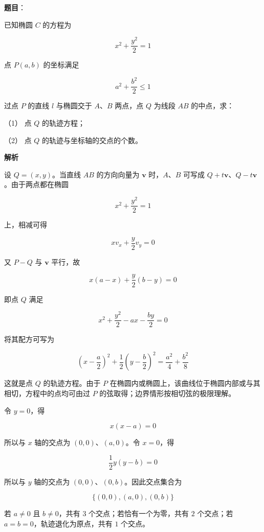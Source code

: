 \begin{answer}

\textbf{题目}：

已知椭圆 $C$ 的方程为

\nopagebreak[4]
\[
x^2+\dfrac{y^2}{2}=1
\]

点 $P(a,b)$ 的坐标满足

\nopagebreak[4]
\[
a^2+\dfrac{b^2}{2}\le1
\]

过点 $P$ 的直线 $l$ 与椭圆交于 $A\text{、}B$ 两点，点 $Q$ 为线段 $AB$ 的中点，求：

（1） 点 $Q$ 的轨迹方程；

（2） 点 $Q$ 的轨迹与坐标轴的交点的个数。

\textbf{解析}


设 $Q=(x,y)$。当直线 $AB$ 的方向向量为 $\boldsymbol v$ 时，$A$、$B$ 可写成 $Q+t\boldsymbol v$、$Q-t\boldsymbol v$。由于两点都在椭圆

\nopagebreak[4]
\[
x^2+\frac{y^2}{2}=1
\]

上，相减可得

\nopagebreak[4]
\[
xv_x+\frac y2v_y=0
\]

又 $P-Q$ 与 $\boldsymbol v$ 平行，故

\nopagebreak[4]
\[
x(a-x)+\frac y2(b-y)=0
\]

即点 $Q$ 满足

\nopagebreak[4]
\[
x^2+\frac{y^2}{2}-ax-\frac{by}{2}=0
\]

将其配方可写为

\nopagebreak[4]
\[
\left(x-\frac a2\right)^2
+\frac12\left(y-\frac b2\right)^2
=\frac{a^2}{4}+\frac{b^2}{8}
\]

这就是点 $Q$ 的轨迹方程。由于 $P$ 在椭圆内或椭圆上，该曲线位于椭圆内部或与其相切，方程中的点均可由过 $P$ 的弦取得；边界情形按相切弦的极限理解。


令 $y=0$，得

\nopagebreak[4]
\[
x(x-a)=0
\]

所以与 $x$ 轴的交点为 $(0,0)$、$(a,0)$。令 $x=0$，得

\nopagebreak[4]
\[
\frac12y(y-b)=0
\]

所以与 $y$ 轴的交点为 $(0,0)$、$(0,b)$。因此交点集合为

\nopagebreak[4]
\[
\{(0,0),(a,0),(0,b)\}
\]

若 $a\ne0$ 且 $b\ne0$，共有 $3$ 个交点；若恰有一个为零，共有 $2$ 个交点；若 $a=b=0$，轨迹退化为原点，共有 $1$ 个交点。



\end{answer}
